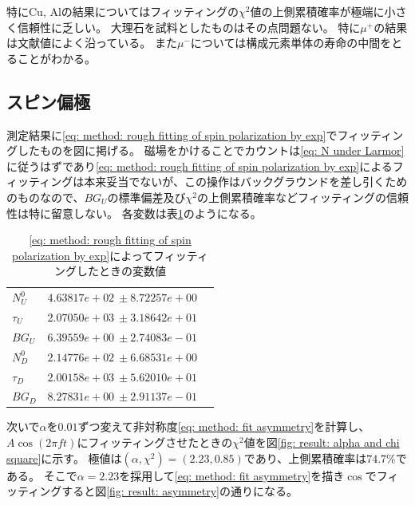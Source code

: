 \documentclass[dvipdfmx]{jsarticle}
\begin{document}
特にCu, Alの結果についてはフィッティングの$\chi^2$値の上側累積確率が極端に小さく信頼性に乏しい。
大理石を試料としたものはその点問題ない。
特に$\mu^+$の結果は文献値によく沿っている。
また$\mu^-$については構成元素単体の寿命の中間をとることがわかる。

\subsection{スピン偏極}

測定結果に\eqref{eq: method: rough fitting of spin polarization by exp}でフィッティングしたものを図に掲げる。
磁場をかけることでカウントは\eqref{eq: N under Larmor}に従うはずであり\eqref{eq: method: rough fitting of spin polarization by exp}によるフィッティングは本来妥当でないが、この操作はバックグラウンドを差し引くためのものなので、$BG_U$の標準偏差及び$\chi^2$の上側累積確率などフィッティングの信頼性は特に留意しない。
各変数は表\ref{table: result: parameters of result with B fit with exp}のようになる。

\begin{table}
    \centering
    \caption{\eqref{eq: method: rough fitting of spin polarization by exp}によってフィッティングしたときの変数値}
    \begin{tabular}[]{lrr}
        \toprule
        $N_U^0$ & $4.63817e+02\:\pm8.72257e+00$
        \\
        $\tau_U$ & $2.07050e+03\:\pm3.18642e+01$
        \\
        $BG_U$ & $6.39559e+00\:\pm2.74083e-01$
        \\
        \midrule
        $N_D^0$ & $2.14776e+02\:\pm6.68531e+00$
        \\
        $\tau_D$ & $2.00158e+03\:\pm5.62010e+01$
        \\
        $BG_D$ & $8.27831e+00\:\pm2.91137e-01$
        \\
        \bottomrule
    \end{tabular}
    \label{table: result: parameters of result with B fit with exp}
\end{table}

次いで$\alpha$を$0.01$ずつ変えて非対称度\eqref{eq: method: fit asymmetry}を計算し、$A\cos(2\pi ft)$にフィッティングさせたときの$\chi^2$値を図\ref{fig: result: alpha and chi square}に示す。
極値は$(\alpha,\chi^2)=(2.23, 0.85)$であり、上側累積確率は$74.7\%$である。
そこで$\alpha=2.23$を採用して\eqref{eq: method: fit asymmetry}を描き$\cos$でフィッティングすると図\ref{fig: result: asymmetry}の通りになる。
\end{document}
